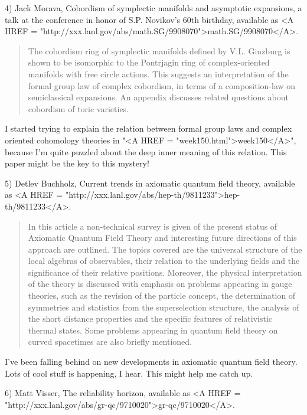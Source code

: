 4) Jack Morava, Cobordism of symplectic manifolds and asymptotic expansions,
a talk at the conference in honor of S.P. Novikov's 60th birthday, 
available as 
<A HREF = "http://xxx.lanl.gov/abs/math.SG/9908070">math.SG/9908070</A>.  

\begin{quote}
    The cobordism ring of symplectic manifolds defined by V.L. Ginzburg 
    is shown to be isomorphic to the Pontrjagin ring of complex-oriented 
    manifolds with free circle actions. This suggests an interpretation 
    of the formal group law of complex cobordism, in terms of a 
    composition-law on semiclassical expansions.  An appendix discusses 
    related questions about cobordism of toric varieties.
\end{quote}
    

I started trying to explain the relation between formal group laws and
complex oriented cohomology theories in "<A HREF =
"week150.html">week150</A>", because I'm quite puzzled about the
deep inner meaning of this relation.  This paper might be the key to
this mystery!

5) Detlev Buchholz, Current trends in axiomatic quantum field theory,
available as <A HREF =
"http://xxx.lanl.gov/abs/hep-th/9811233">hep-th/9811233</A>.

\begin{quote}
     In this article a non-technical survey is given of the present
     status of Axiomatic Quantum Field Theory and interesting future
     directions of this approach are outlined. The topics covered are
     the universal structure of the local algebras of observables, their
     relation to the underlying fields and the significance of their
     relative positions. Moreover, the physical interpretation of the
     theory is discussed with emphasis on problems appearing in gauge
     theories, such as the revision of the particle concept, the
     determination of symmetries and statistics from the superselection
     structure, the analysis of the short distance properties and the
     specific features of relativistic thermal states. Some problems
     appearing in quantum field theory on curved spacetimes are also
     briefly mentioned.

\end{quote}
    
I've been falling behind on new developments in axiomatic quantum field
theory.  Lots of cool stuff is happening, I hear.  This might help me
catch up.

6) Matt Visser, The reliability horizon, available as <A HREF = "http://xxx.lanl.gov/abs/gr-qc/9710020">gr-qc/9710020</A>.


